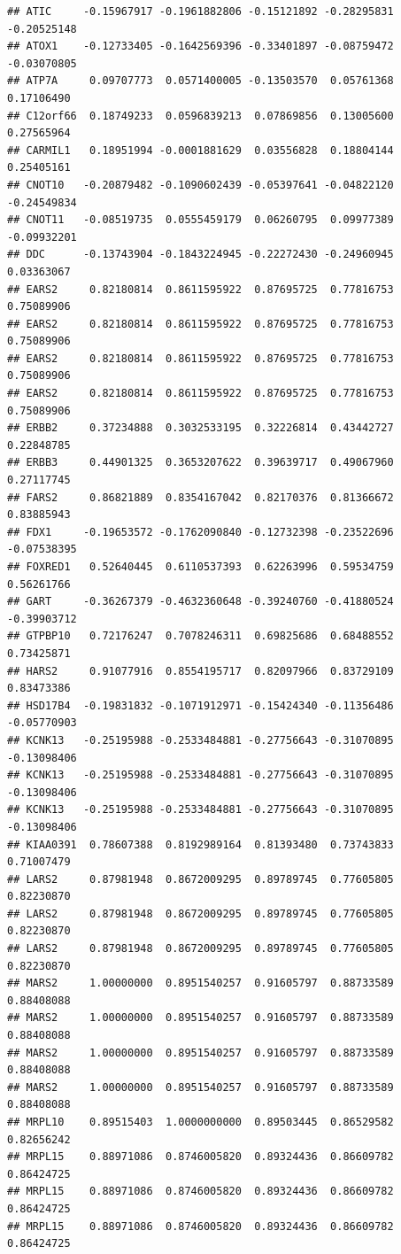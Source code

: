 \documentclass[
]{article}
\begin{document}
\begin{verbatim}
## ATIC     -0.15967917 -0.1961882806 -0.15121892 -0.28295831 -0.20525148
## ATOX1    -0.12733405 -0.1642569396 -0.33401897 -0.08759472 -0.03070805
## ATP7A     0.09707773  0.0571400005 -0.13503570  0.05761368  0.17106490
## C12orf66  0.18749233  0.0596839213  0.07869856  0.13005600  0.27565964
## CARMIL1   0.18951994 -0.0001881629  0.03556828  0.18804144  0.25405161
## CNOT10   -0.20879482 -0.1090602439 -0.05397641 -0.04822120 -0.24549834
## CNOT11   -0.08519735  0.0555459179  0.06260795  0.09977389 -0.09932201
## DDC      -0.13743904 -0.1843224945 -0.22272430 -0.24960945  0.03363067
## EARS2     0.82180814  0.8611595922  0.87695725  0.77816753  0.75089906
## EARS2     0.82180814  0.8611595922  0.87695725  0.77816753  0.75089906
## EARS2     0.82180814  0.8611595922  0.87695725  0.77816753  0.75089906
## EARS2     0.82180814  0.8611595922  0.87695725  0.77816753  0.75089906
## ERBB2     0.37234888  0.3032533195  0.32226814  0.43442727  0.22848785
## ERBB3     0.44901325  0.3653207622  0.39639717  0.49067960  0.27117745
## FARS2     0.86821889  0.8354167042  0.82170376  0.81366672  0.83885943
## FDX1     -0.19653572 -0.1762090840 -0.12732398 -0.23522696 -0.07538395
## FOXRED1   0.52640445  0.6110537393  0.62263996  0.59534759  0.56261766
## GART     -0.36267379 -0.4632360648 -0.39240760 -0.41880524 -0.39903712
## GTPBP10   0.72176247  0.7078246311  0.69825686  0.68488552  0.73425871
## HARS2     0.91077916  0.8554195717  0.82097966  0.83729109  0.83473386
## HSD17B4  -0.19831832 -0.1071912971 -0.15424340 -0.11356486 -0.05770903
## KCNK13   -0.25195988 -0.2533484881 -0.27756643 -0.31070895 -0.13098406
## KCNK13   -0.25195988 -0.2533484881 -0.27756643 -0.31070895 -0.13098406
## KCNK13   -0.25195988 -0.2533484881 -0.27756643 -0.31070895 -0.13098406
## KIAA0391  0.78607388  0.8192989164  0.81393480  0.73743833  0.71007479
## LARS2     0.87981948  0.8672009295  0.89789745  0.77605805  0.82230870
## LARS2     0.87981948  0.8672009295  0.89789745  0.77605805  0.82230870
## LARS2     0.87981948  0.8672009295  0.89789745  0.77605805  0.82230870
## MARS2     1.00000000  0.8951540257  0.91605797  0.88733589  0.88408088
## MARS2     1.00000000  0.8951540257  0.91605797  0.88733589  0.88408088
## MARS2     1.00000000  0.8951540257  0.91605797  0.88733589  0.88408088
## MARS2     1.00000000  0.8951540257  0.91605797  0.88733589  0.88408088
## MRPL10    0.89515403  1.0000000000  0.89503445  0.86529582  0.82656242
## MRPL15    0.88971086  0.8746005820  0.89324436  0.86609782  0.86424725
## MRPL15    0.88971086  0.8746005820  0.89324436  0.86609782  0.86424725
## MRPL15    0.88971086  0.8746005820  0.89324436  0.86609782  0.86424725

\end{verbatim}
\end{document}
